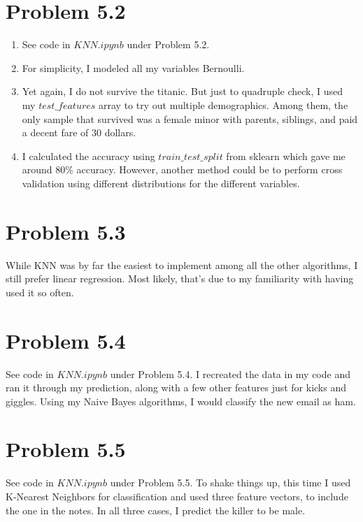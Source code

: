 \documentclass{article}
\begin{document}
\section*{Problem 5.2}
\begin{enumerate}[label=(\alph*)]
  \item See code in $KNN.ipynb$ under Problem 5.2.
  \item For simplicity, I modeled all my variables Bernoulli.
  \item Yet again, I do not survive the titanic. But just to quadruple check, I used my $test\_features$ array to try out multiple demographics. Among them, the only sample that survived was a female minor with parents, siblings, and paid a decent fare of 30 dollars.
  \item I calculated the accuracy using $train\_test\_split$ from sklearn which gave me around 80\% accuracy. However, another method could be to perform cross validation using different distributions for the different variables.
\end{enumerate}

\section*{Problem 5.3}

While KNN was by far the easiest to implement among all the other algorithms, I still prefer linear regression. Most likely, that's due to my familiarity with having used it so often.

\section*{Problem 5.4}

See code in $KNN.ipynb$ under Problem 5.4. I recreated the data in my code and ran it through my prediction, along with a few other features just for kicks and giggles. Using my Naive Bayes algorithms, I would classify the new email as ham.

\section*{Problem 5.5}
See code in $KNN.ipynb$ under Problem 5.5. To shake things up, this time I used K-Nearest Neighbors for classification and used three feature vectors, to include the one in the notes. In all three cases, I predict the killer to be male.
\end{document}
